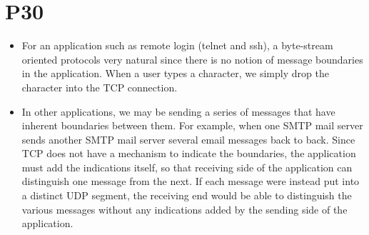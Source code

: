 \documentclass[a4paper, 11pt]{article}
\begin{document}
\section*{P30}
\begin{itemize}
	\item For an application such as remote login (telnet and ssh), a byte-stream oriented protocols very natural since there is no notion of message boundaries in the application. When a user types a character, we simply drop the character into the TCP connection. 
	\item In other applications, we may be sending a series of messages that have inherent boundaries between them. For example, when one SMTP mail server sends another SMTP mail server several email messages back to back. Since TCP does not have a mechanism to indicate the boundaries, the application must add the indications itself, so that receiving side of the application can distinguish one message from the next. If each message were instead put into a distinct UDP segment, the receiving end would be able to distinguish the various messages without any indications added by the sending side of the application.
\end{itemize}
\end{document}
